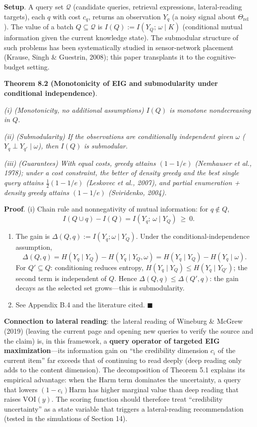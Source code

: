 \documentclass[
  11pt]{article}
\begin{document}
\textbf{Setup}. A query set \(\mathcal{Q}\) (candidate queries,
retrieval expressions, lateral-reading targets), each \(q\) with cost
\(c_q\), returns an observation \(Y_q\) (a noisy signal about
\(\Theta_{\mathrm{rel}}\)). The value of a batch
\(Q \subseteq \mathcal{Q}\) is \(I(Q) := I(Y_Q;\, \omega \mid K)\)
(conditional mutual information given the current knowledge state). The
submodular structure of such problems has been systematically studied in
sensor-network placement (Krause, Singh \& Guestrin, 2008); this paper
transplants it to the cognitive-budget setting.

\textbf{Theorem 8.2 (Monotonicity of EIG and submodularity under
conditional independence)}.

\emph{(i) (Monotonicity, no additional assumptions) \(I(Q)\) is monotone
nondecreasing in \(Q\).}

\emph{(ii) (Submodularity) If the observations are conditionally
independent given \(\omega\) (\(Y_q \perp Y_{q'} \mid \omega\)), then
\(I(Q)\) is submodular.}

\emph{(iii) (Guarantees) With equal costs, greedy attains \((1-1/e)\)
(Nemhauser et al., 1978); under a cost constraint, the better of density
greedy and the best single query attains \(\frac12(1-1/e)\) (Leskovec et
al., 2007), and partial enumeration + density greedy attains \((1-1/e)\)
(Sviridenko, 2004).}

\textbf{Proof}. (i) Chain rule and nonnegativity of mutual information:
for \(q \notin Q\),
\[I(Q \cup q) - I(Q) = I(Y_q;\, \omega \mid Y_Q) \ \ge\ 0.\]

\begin{enumerate}
\def\labelenumi{(\roman{enumi})}
\setcounter{enumi}{1}
\item
  The gain is \(\Delta(Q, q) := I(Y_q; \omega \mid Y_Q)\). Under the
  conditional-independence assumption,
  \[\Delta(Q,q) = H(Y_q \mid Y_Q) - H(Y_q \mid Y_Q, \omega) = H(Y_q \mid Y_Q) - H(Y_q \mid \omega).\]
  For \(Q' \subseteq Q\): conditioning reduces entropy,
  \(H(Y_q \mid Y_Q) \le H(Y_q \mid Y_{Q'})\); the second term is
  independent of \(Q\). Hence \(\Delta(Q, q) \le \Delta(Q', q)\): the
  gain decays as the selected set grows---this is submodularity.
\item
  See Appendix B.4 and the literature cited. \(\blacksquare\)
\end{enumerate}

\textbf{Connection to lateral reading}: the lateral reading of Wineburg
\& McGrew (2019) (leaving the current page and opening new queries to
verify the source and the claim) is, in this framework, a \textbf{query
operator of targeted EIG maximization}---its information gain on ``the
credibility dimension \(c_i\) of the current item'' far exceeds that of
continuing to read deeply (deep reading only adds to the content
dimension). The decomposition of Theorem 5.1 explains its empirical
advantage: when the \(\mathrm{Harm}\) term dominates the uncertainty, a
query that lowers \((1-c_i)\mathrm{Harm}\) has higher marginal value
than deep reading that raises \(\mathrm{VOI}(y)\). The scoring function
should therefore treat ``credibility uncertainty'' as a state variable
that triggers a lateral-reading recommendation (tested in the
simulations of Section 14).
\end{document}
